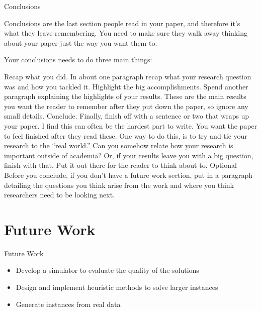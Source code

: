 Conclusions

Conclusions are the last section people read in your paper, and therefore it’s what they leave remembering. You need to make sure they walk away thinking about your paper just the way you want them to.

Your conclusions needs to do three main things:

    Recap what you did. In about one paragraph recap what your research question was and how you tackled it.
    Highlight the big accomplishments. Spend another paragraph explaining the highlights of your results. These are the main results you want the reader to remember after they put down the paper, so ignore any small details.
    Conclude. Finally, finish off with a sentence or two that wraps up your paper. I find this can often be the hardest part to write. You want the paper to feel finished after they read these. One way to do this, is to try and tie your research to the “real world.” Can you somehow relate how your research is important outside of academia? Or, if your results leave you with a big question, finish with that. Put it out there for the reader to think about to.
    Optional Before you conclude, if you don’t have a future work section, put in a paragraph detailing the questions you think arise from the work and where you think researchers need to be looking next.



\section{Future Work}
\begin{frame}{Future Work}
  \begin{itemize}
  \item Develop a simulator to evaluate the quality of the solutions
  \item Design and implement heuristic methods to solve larger instances
  \item Generate instances from real data
  \end{itemize}
\end{frame}

